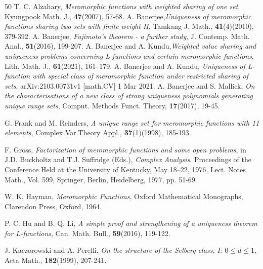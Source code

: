 \documentclass[a4paper,draft]{amsproc}
\theoremstyle{plain}
\theoremstyle{definition}
\theoremstyle{remark}
\numberwithin{equation}{section}
\renewcommand{\leq}{\leqslant}\renewcommand{\geq}{\geqslant}
\begin{document}
\begin{thebibliography}{50}
 T. C. Alzahary, {\em Meromorphic functions with weighted sharing of one set}, Kyungpook Math. J., {\bf 47}(2007), 57-68.
 A. Banerjee,{\em Uniqueness of meromorphic functions sharing two sets with finite weight II}, Tamkang J. Math., {\bf 41}(4)(2010), 379-392.
 A. Banerjee, {\em Fujimoto’s theorem - a further study}, J. Contemp. Math. Anal., {\bf 51}(2016), 199-207.
 A. Banerjee and A. Kundu,{\em Weighted value sharing and uniqueness problems concerning L-functions and certain meromorphic functions}, Lith. Math. J., {\bf61}(2021), 161–179.
 A. Banerjee and A. Kundu, {\em Uniqueness of L-function with special class of meromorphic function under restricted sharing of sets}, arXiv:2103.00731v1 [math.CV] 1 Mar 2021.
 A. Banerjee and S. Mallick, {\em On the characterisations of a new class of
strong uniqueness polynomials generating
unique range sets}, Comput. Methods Funct. Theory, {\bf 17}(2017), 19-45.

 G. Frank and M. Reinders, {\em A unique range set for meromorphic functions with 11 elements}, Complex Var.Theory Appl., {\bf 37}(1)(1998), 185-193.


 F. Gross, {\em Factorization of meromorphic functions and some open problems}, in J.D. Buckholtz and T.J. Suffridge
(Eds.), \emph{Complex Analysis}. Proceedings of the Conference Held at the University of Kentucky, May 18–22, 1976, Lect.
Notes Math., Vol. 599, Springer, Berlin, Heidelberg, 1977, pp. 51-69.

W. K. Hayman, {\em Meromorphic Functions}, Oxford Mathematical Monographs, Clarendon Press,
Oxford, 1964.

 P. C. Hu and B. Q. Li, {\em A simple proof and strengthening of a uniqueness theorem for L-functions}, Can. Math. Bull.,
{\bf59}(2016), 119-122.

J. Kaczorowski and A. Perelli, {\em On the structure of the Selberg class, I: $0 \leq d \leq 1$}, Acta Math., {\bf182}(1999), 207-241.


\end{thebibliography}
\end{document}
